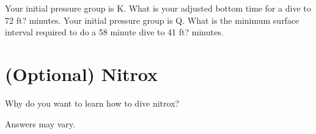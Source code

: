 \documentclass[12pt,letter]{exam}
\begin{document}
\begin{questions}

        \question Your initial pressure group is K.  What is your adjusted bottom time for a dive to 72 ft? \fillin[9] minutes.
        \question Your initial pressure group is Q. What is the minimum surface interval required to do a 58 minute dive to 41 ft? \fillin[64] minutes.

        \section{(Optional) Nitrox}
        \question Why do you want to learn how to dive nitrox?
        \begin{solution}[2in]
            Answers may vary.
        \end{solution}

\end{questions}
\end{document}
